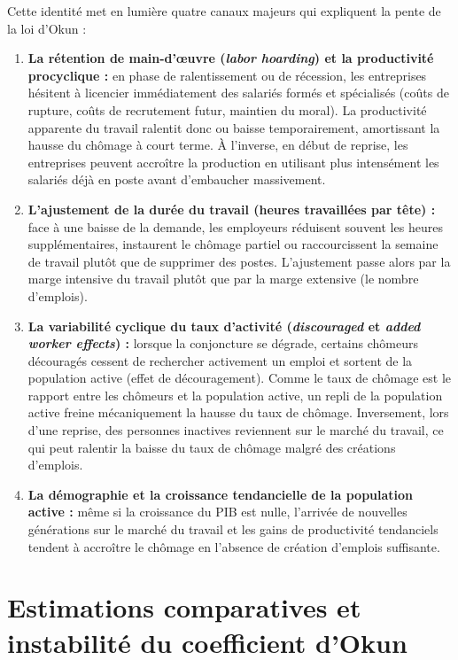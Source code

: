 \documentclass[11pt,a4paper]{article}
\begin{document}
Cette identité met en lumière quatre canaux majeurs qui expliquent la pente de la loi d'Okun :

\begin{enumerate}[leftmargin=1.5em]
    \item \textbf{La rétention de main-d'œuvre (\textit{labor hoarding}) et la productivité procyclique :} en phase de ralentissement ou de récession, les entreprises hésitent à licencier immédiatement des salariés formés et spécialisés (coûts de rupture, coûts de recrutement futur, maintien du moral). La productivité apparente du travail ralentit donc ou baisse temporairement, amortissant la hausse du chômage à court terme. À l'inverse, en début de reprise, les entreprises peuvent accroître la production en utilisant plus intensément les salariés déjà en poste avant d'embaucher massivement.
    \item \textbf{L'ajustement de la durée du travail (heures travaillées par tête) :} face à une baisse de la demande, les employeurs réduisent souvent les heures supplémentaires, instaurent le chômage partiel ou raccourcissent la semaine de travail plutôt que de supprimer des postes. L'ajustement passe alors par la marge intensive du travail plutôt que par la marge extensive (le nombre d'emplois).
    \item \textbf{La variabilité cyclique du taux d'activité (\textit{discouraged} et \textit{added worker effects}) :} lorsque la conjoncture se dégrade, certains chômeurs découragés cessent de rechercher activement un emploi et sortent de la population active (effet de découragement). Comme le taux de chômage est le rapport entre les chômeurs et la population active, un repli de la population active freine mécaniquement la hausse du taux de chômage. Inversement, lors d'une reprise, des personnes inactives reviennent sur le marché du travail, ce qui peut ralentir la baisse du taux de chômage malgré des créations d'emplois.
    \item \textbf{La démographie et la croissance tendancielle de la population active :} même si la croissance du PIB est nulle, l'arrivée de nouvelles générations sur le marché du travail et les gains de productivité tendanciels tendent à accroître le chômage en l'absence de création d'emplois suffisante.
\end{enumerate}

\section{Estimations comparatives et instabilité du coefficient d'Okun}
\end{document}

